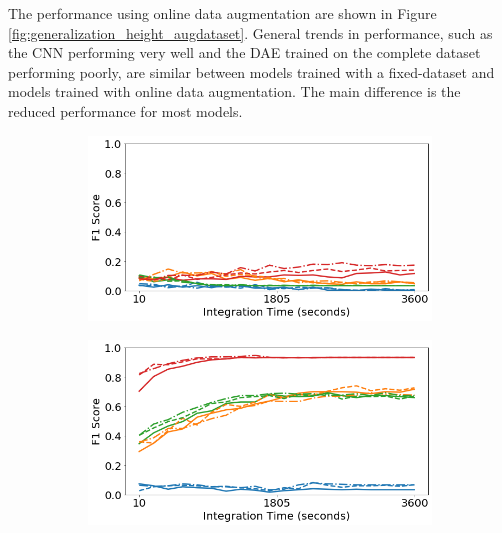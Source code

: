 The performance using online data augmentation are shown in Figure \ref{fig:generalization_height_augdataset}. General trends in performance, such as the CNN performing very well and the DAE trained on the complete dataset performing poorly, are similar between models trained with a fixed-dataset and models trained with online data augmentation. The main difference is the reduced performance for most models.

\begin{figure}[H]
     \centering
     \begin{subfigure}[b]{0.49\textwidth}
         \centering
         \includegraphics[width=\textwidth]{images/generalization-height-aug-easy-01.png}
         \caption{}
         \label{fig:generalization-height-aug-easy-01}
     \end{subfigure}
     \hfill
     \begin{subfigure}[b]{0.49\textwidth}
         \centering
         \includegraphics[width=\textwidth]{images/generalization-height-aug-easy-05.png}
         \caption{}
         \label{fig:generalization-height-aug-easy-05}
     \end{subfigure}


\end{figure}
